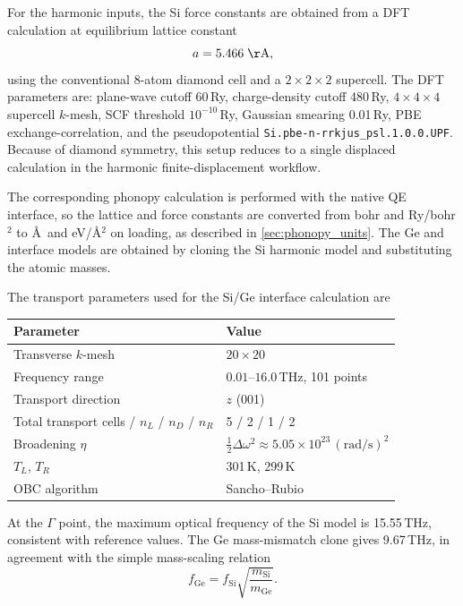 For the harmonic inputs, the Si force constants are obtained from a DFT
calculation at equilibrium lattice constant
\begin{equation}
  a = 5.466\;\mathrm{\AA},
\end{equation}
using the conventional 8-atom diamond cell and a
$2\times2\times2$ supercell.  The DFT parameters are:
plane-wave cutoff 60\,Ry, charge-density cutoff 480\,Ry,
$4\times4\times4$ supercell $k$-mesh, SCF threshold
$10^{-10}$\,Ry, Gaussian smearing 0.01\,Ry, PBE exchange-correlation,
and the pseudopotential
\texttt{Si.pbe-n-rrkjus\_psl.1.0.0.UPF}.  Because of diamond symmetry,
this setup reduces to a single displaced calculation in the harmonic
finite-displacement workflow.

The corresponding phonopy calculation is performed with the native QE
interface, so the lattice and force constants are converted from bohr
and Ry/bohr$^2$ to \AA\ and eV/\AA$^2$ on loading, as described in
\cref{sec:phonopy_units}.  The Ge and interface models are obtained by
cloning the Si harmonic model and substituting the atomic masses.

The transport parameters used for the Si/Ge interface calculation are
\begin{center}
\begin{tabular}{ll}
  \toprule
  Parameter & Value \\
  \midrule
  Transverse $k$-mesh & $20\times20$ \\
  Frequency range & $0.01$--$16.0$\,THz, 101 points \\
  Transport direction & $z$ (001) \\
  Total transport cells / $n_L$ / $n_D$ / $n_R$ & 5 / 2 / 1 / 2 \\
  Broadening $\eta$ & $\tfrac12 \Delta\omega^2 \approx 5.05\times10^{23}\,(\mathrm{rad/s})^2$ \\
  $T_L$, $T_R$ & 301\,K, 299\,K \\
  OBC algorithm & Sancho--Rubio \\
  \bottomrule
\end{tabular}
\end{center}

At the $\Gamma$ point, the maximum optical frequency of the Si model is
15.55\,THz, consistent with reference values.  The Ge mass-mismatch
clone gives 9.67\,THz, in agreement with the simple mass-scaling
relation
\begin{equation}
  f_\mathrm{Ge}
  = f_\mathrm{Si}\sqrt{\frac{m_\mathrm{Si}}{m_\mathrm{Ge}}}.
\end{equation}

